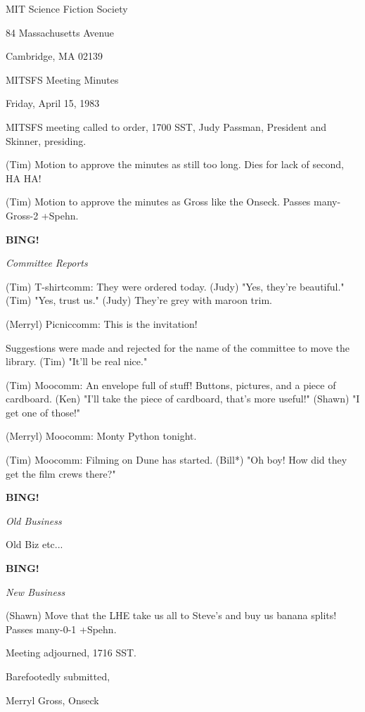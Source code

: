 \documentclass[12pt]{article}
\newcommand{\bing}{{\bf BING!} }
\newcommand{\goto}[1]{\bing \vskip 12pt \centerline{{\em{#1}}}}
\begin{document}
\begin{center}

MIT Science Fiction Society 

84 Massachusetts Avenue

Cambridge, MA 02139

\vspace{12pt}

MITSFS Meeting Minutes 

Friday, April 15, 1983

\end{center}
 
\vspace{18pt}

\setlength{\parskip}{6pt}

\noindent
MITSFS meeting called to order, 1700 SST,
Judy Passman, President and Skinner, presiding.

(Tim) Motion to approve the minutes as still too long. Dies for lack of second, HA HA!

(Tim) Motion to approve the minutes as Gross like the Onseck. Passes many-Gross-2 +Spehn.

\goto{Committee Reports}

(Tim) T-shirtcomm: They were ordered today. (Judy) "Yes, they're beautiful." (Tim) "Yes, trust us." (Judy) They're grey with maroon trim.

(Merryl) Picniccomm: This is the invitation!

Suggestions were made and rejected for the name of the committee to move the library. (Tim) "It'll be real nice."

(Tim) Moocomm: An envelope full of stuff! Buttons, pictures, and a piece of cardboard. (Ken) "I'll take the piece of cardboard, that's more useful!" (Shawn) "I get one of those!"

(Merryl) Moocomm: Monty Python tonight.

(Tim) Moocomm: Filming on Dune has started. (Bill*) "Oh boy! How did they get the film crews there?"

\goto{Old Business}

Old Biz etc...

\goto{New Business}

(Shawn) Move that the LHE take us all to Steve's and buy us banana splits! Passes many-0-1 +Spehn.

\vspace{12pt}

\noindent
Meeting adjourned, 1716 SST.

\vspace{18pt}

\centerline{Barefootedly submitted,}
\centerline{Merryl Gross, Onseck}
\end{document}
